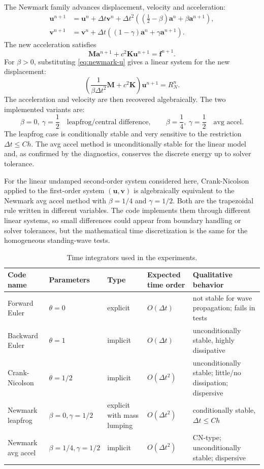 \documentclass[11pt,a4paper]{article}
\newcommand{\dt}{\Delta t}
\newcommand{\Uh}{\mathbf{u}}
\newcommand{\Vh}{\mathbf{v}}
\newcommand{\Ah}{\mathbf{a}}
\newcommand{\M}{\mathbf{M}}
\newcommand{\K}{\mathbf{K}}
\newcommand{\F}{\mathbf{f}}
\begin{document}
The Newmark family advances displacement, velocity and acceleration:
\begin{align}
\Uh^{n+1}
&=\Uh^n+\dt\Vh^n+\dt^2\left(\left(\frac12-\beta\right)\Ah^n+\beta\Ah^{n+1}\right),
\label{eq:newmark-u}\\
\Vh^{n+1}
&=\Vh^n+\dt\left((1-\gamma)\Ah^n+\gamma\Ah^{n+1}\right).
\label{eq:newmark-v}
\end{align}
The new acceleration satisfies
\[
\M\Ah^{n+1}+c^2\K\Uh^{n+1}=\F^{n+1}.
\]
For $\beta>0$, substituting \eqref{eq:newmark-u} gives a linear system for the
new displacement:
\begin{equation}
\left(\frac{1}{\beta\dt^2}\M+c^2\K\right)\Uh^{n+1}=R_N^n.
\label{eq:newmark-system}
\end{equation}
The acceleration and velocity are then recovered algebraically.  The two
implemented variants are:
\[
\beta=0,\ \gamma=\frac12 \quad\text{leapfrog/central difference},\qquad
\beta=\frac14,\ \gamma=\frac12 \quad\text{avg accel}.
\]
The leapfrog case is conditionally stable and very sensitive to the restriction
$\dt \le Ch$.  The avg accel method is unconditionally stable for the linear
model and, as confirmed by the diagnostics, conserves the discrete energy up to
solver tolerance.

For the linear undamped second-order system considered here, Crank-Nicolson
applied to the first-order system $(\Uh,\Vh)$ is algebraically equivalent to the
Newmark avg accel method with $\beta=1/4$ and $\gamma=1/2$.  Both are the
trapezoidal rule written in different variables.  The code implements them
through different linear systems, so small differences could appear from
boundary handling or solver tolerances, but the mathematical time discretization
is the same for the homogeneous standing-wave tests.

\begin{table}[H]
\centering
\caption{Time integrators used in the experiments.}
\label{tab:schemes}
\footnotesize
\setlength{\tabcolsep}{2pt}
\begin{tabular}{@{}L{0.18\textwidth}L{0.2\textwidth}L{0.16\textwidth}L{0.16\textwidth}L{0.23\textwidth}@{}}
\toprule
Code name & Parameters & Type & Expected time order & Qualitative behavior \\
\midrule
Forward Euler & $\theta=0$ & explicit & $O(\dt)$ & not stable for wave propagation; fails in tests \\
Backward Euler & $\theta=1$ & implicit & $O(\dt)$ & unconditionally stable, highly dissipative \\
Crank-Nicolson & $\theta=1/2$ & implicit & $O(\dt^2)$ & unconditionally stable; little/no dissipation; dispersive \\
Newmark leapfrog & $\beta=0,\gamma=1/2$ & explicit with mass lumping & $O(\dt^2)$ & conditionally stable, $\dt\le Ch$ \\
Newmark avg accel & $\beta=1/4,\gamma=1/2$ & implicit & $O(\dt^2)$ & CN-type; unconditionally stable; dispersive \\
\bottomrule
\end{tabular}
\end{table}
\end{document}
